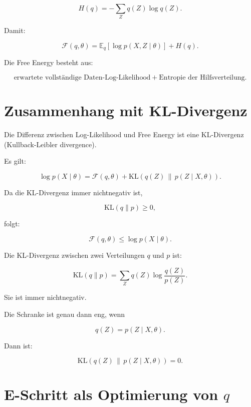 \[
    H(q)
    =
    -\sum_Z
    q(Z)\log q(Z).
\]

Damit:

\[
    \mathcal{F}(q,\theta)
    =
    \mathbb{E}_{q}
    [
        \log p(X,Z\mid\theta)
    ]
    +
    H(q).
\]

\begin{conceptbox}
Die Free Energy besteht aus:

\[
    \text{erwartete vollständige Daten-Log-Likelihood}
    +
    \text{Entropie der Hilfsverteilung}.
\]
\end{conceptbox}

\section{Zusammenhang mit KL-Divergenz}

Die Differenz zwischen Log-Likelihood und Free Energy ist eine KL-Divergenz (Kullback-Leibler divergence).

Es gilt:

\[
    \log p(X\mid\theta)
    =
    \mathcal{F}(q,\theta)
    +
    \mathrm{KL}
    \left(
        q(Z)
        \,\|\, 
        p(Z\mid X,\theta)
    \right).
\]

Da die KL-Divergenz immer nichtnegativ ist,

\[
    \mathrm{KL}(q\|p)\geq 0,
\]

folgt:

\[
    \mathcal{F}(q,\theta)
    \leq
    \log p(X\mid\theta).
\]

\begin{definitionbox}
Die KL-Divergenz zwischen zwei Verteilungen \(q\) und \(p\) ist:

\[
    \mathrm{KL}(q\|p)
    =
    \sum_Z
    q(Z)
    \log
    \frac{q(Z)}{p(Z)}.
\]

Sie ist immer nichtnegativ.
\end{definitionbox}

Die Schranke ist genau dann eng, wenn

\[
    q(Z)
    =
    p(Z\mid X,\theta).
\]

Dann ist:

\[
    \mathrm{KL}
    \left(
        q(Z)
        \,\|\,
        p(Z\mid X,\theta)
    \right)
    =
    0.
\]

\section{E-Schritt als Optimierung von \(q\)}

